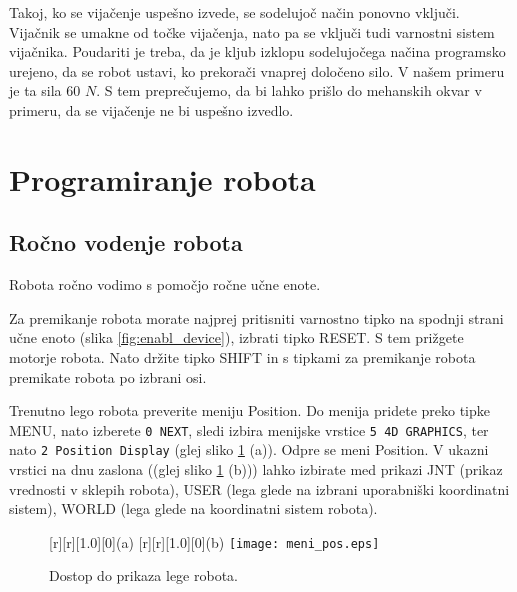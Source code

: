 Takoj, ko se vijačenje uspešno izvede, se sodelujoč način ponovno vključi. Vijačnik se umakne od točke vijačenja, nato pa se vključi tudi varnostni sistem vijačnika. Poudariti je treba, da je kljub izklopu sodelujočega načina programsko urejeno, da se robot ustavi, ko prekorači vnaprej določeno silo. V našem primeru je ta sila $60$ $N$. S tem preprečujemo, da bi lahko prišlo do mehanskih okvar v primeru, da se vijačenje ne bi uspešno izvedlo. 

\newpage

\section{Programiranje robota}

\subsection{Ročno vodenje robota}

Robota ročno vodimo s pomočjo ročne učne enote. 

\begin{mdframed}[backgroundcolor=yellow!20, shadow=true,roundcorner=8pt]

Za premikanje robota morate najprej pritisniti varnostno tipko na spodnji strani učne enoto (slika \ref{fig:enabl_device}), izbrati tipko RESET. S tem prižgete motorje robota. Nato držite tipko SHIFT in s tipkami za premikanje robota premikate robota po izbrani osi.

\end{mdframed}

\begin{mdframed}[backgroundcolor=yellow!20, shadow=true,roundcorner=8pt]
	
Trenutno lego robota preverite meniju Position. Do menija pridete preko tipke MENU, nato izberete \verb|0 NEXT|, sledi izbira menijske vrstice \verb|5 4D GRAPHICS|, ter nato \verb|2 Position Display| (glej sliko \ref{fig:menu_pos} (a)). Odpre se meni Position. V ukazni vrstici na dnu zaslona ((glej sliko \ref{fig:menu_pos} (b))) lahko izbirate med prikazi JNT (prikaz vrednosti v sklepih robota), USER (lega glede na izbrani uporabniški koordinatni sistem), WORLD (lega glede na koordinatni sistem robota).
	
\end{mdframed}

\begin{figure}[!hbt]
	\centering
	[r][1.0][0]{(a)}
	[r][1.0][0]{(b)}
	\texttt{[image: meni\_pos.eps]}
	\caption{Dostop do prikaza lege robota.}
	\label{fig:menu_pos}
\end{figure}

